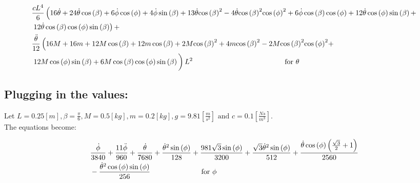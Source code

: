 \begin{equation}
    \begin{split}
        &\frac{cL^4}{6}\left(16\mathrm{\dot\theta}+24\mathrm{\dot\theta}\cos\left(\beta \right)+6\mathrm{\dot\phi}\cos\left(\phi \right)+4\mathrm{\dot\phi}\sin\left(\beta \right)+13\mathrm{\dot\theta}{\cos\left(\beta \right)}^2-4\mathrm{\dot\theta}{\cos\left(\beta \right)}^2{\cos\left(\phi \right)}^2+6\mathrm{\dot\phi}\cos\left(\beta \right)\cos\left(\phi \right)+12\mathrm{\dot\theta}\cos\left(\phi \right)\sin\left(\beta \right)+\right.\\
        &\left.12\mathrm{\dot\theta}\cos\left(\beta \right)\cos\left(\phi \right)\sin\left(\beta \right)\right)+\\
        &\frac{\mathrm{\ddot\theta}}{12} \left(16M+16m+12M\cos\left(\beta \right)+12m\cos\left(\beta \right)+2M{\cos\left(\beta \right)}^2+4m{\cos\left(\beta \right)}^2-2M{\cos\left(\beta \right)}^2{\cos\left(\phi \right)}^2+\right.\\
        &\left.12M\cos\left(\phi \right)\sin\left(\beta \right)+6M\cos\left(\beta \right)\cos\left(\phi \right)\sin\left(\beta \right)\vphantom{\int}\right)L^2\hspace{45mm}\text{for } \theta
    \end{split}
\end{equation}


\subsection{Plugging in the values:}

Let $L = 0.25 [m], \beta = \frac{\pi}{6},M= 0.5 [kg],m= 0.2 [kg], g = 9.81[\frac{m}{s^2}] \text{ and } c = 0.1[\frac{Ns}{m^3}]$.\vspace{3mm}\\

The equations become:

\begin{equation}
    \begin{split}
        &\frac{\mathrm{\dot\phi}}{3840}+\frac{11\mathrm{\ddot\phi}}{960}+\frac{\mathrm{\dot\theta}}{7680}+\frac{{\mathrm{\dot\theta}}^2\sin\left(\phi \right)}{128}+\frac{981\sqrt{3}\sin\left(\phi \right)}{3200}+\frac{\sqrt{3}{\mathrm{\dot\theta}}^2\sin\left(\phi \right)}{512}+\frac{\mathrm{\dot\theta}\cos\left(\phi \right)\left(\frac{\sqrt{3}}{2}+1\right)}{2560}\\
        &-\frac{{\mathrm{\dot\theta}}^2\cos\left(\phi \right)\sin\left(\phi \right)}{256}\hspace{25mm} \text{for } \phi
    \end{split}
\end{equation}

